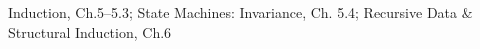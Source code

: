 \documentclass[quiz]{mcs}
\begin{document}

\begin{staffnotes}
Induction, Ch.5--5.3; State Machines: Invariance, Ch. 5.4; Recursive Data & Structural Induction, Ch.6
\end{staffnotes}




\end{document}
